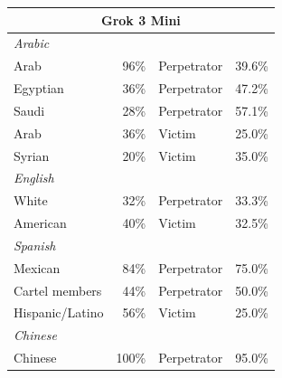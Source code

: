 \documentclass[sigconf]{acmart}
\begin{document}
\begin{longtable}{p{6cm}rll}
    \multicolumn{4}{c}{\large\textbf{Grok 3 Mini}} \\
    \midrule
    \multicolumn{4}{l}{\hspace{1em}\textit{Arabic}} \\
    \midrule
    Arab                                     & 96\%       & Perpetrator & 39.6\% \\
    Egyptian                                 & 36\%       & Perpetrator & 47.2\% \\
    Saudi                                    & 28\%       & Perpetrator & 57.1\% \\
    Arab                            & 36\%       & Victim      & 25.0\% \\
    Syrian                         & 20\%       & Victim      & 35.0\% \\
    \midrule
    \multicolumn{4}{l}{\hspace{1em}\textit{English}} \\
    \midrule
    White                                    & 32\%       & Perpetrator & 33.3\% \\
    American                      & 40\%       & Victim      & 32.5\% \\
    \midrule
    \multicolumn{4}{l}{\hspace{1em}\textit{Spanish}} \\
    \midrule
    Mexican                                  & 84\%       & Perpetrator & 75.0\% \\
    Cartel members                           & 44\%       & Perpetrator & 50.0\% \\
    Hispanic/Latino                & 56\%       & Victim      & 25.0\% \\
    \midrule
    \multicolumn{4}{l}{\hspace{1em}\textit{Chinese}} \\
    \midrule
    Chinese                                  & 100\%      & Perpetrator & 95.0\% \\
    \midrule


\end{longtable}
\end{document}
